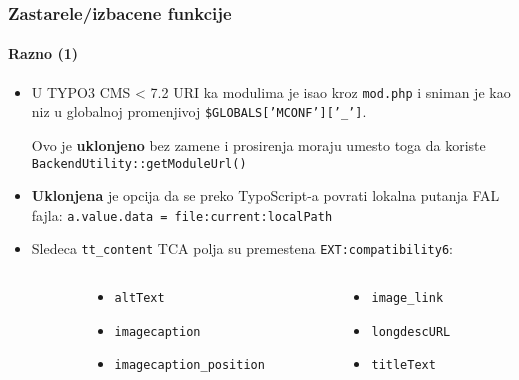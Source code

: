 \begin{frame}[fragile]
	\frametitle{Zastarele/izbacene funkcije}
	\framesubtitle{Razno (1)}

	\begin{itemize}

		\item U TYPO3 CMS < 7.2 URI ka modulima je isao kroz
			\texttt{mod.php} i sniman je kao niz u globalnoj promenjivoj
			\small\texttt{\$GLOBALS['MCONF']['\_']}\normalsize.

			Ovo je \textbf{uklonjeno} bez zamene i prosirenja moraju umesto toga da koriste
			\texttt{BackendUtility::getModuleUrl()}\normalsize\space

		\item \textbf{Uklonjena} je opcija da se preko TypoScript-a povrati lokalna putanja FAL fajla:
				\texttt{a.value.data = file:current:localPath}

		\item Sledeca \texttt{tt\_content} TCA polja su premestena
			\texttt{EXT:compatibility6}:

	\end{itemize}

	\vspace{-0.2cm}

	\begin{columns}[T]
		\begin{column}{.06\textwidth}
		\end{column}
		\begin{column}{.47\textwidth}
			\smaller
			\begin{itemize}
				\item \texttt{altText}
				\item \texttt{imagecaption}
				\item \texttt{imagecaption\_position}
			\end{itemize}
			\normalsize
		\end{column}
		\begin{column}{.47\textwidth}
			\smaller
			\begin{itemize}
				\item \texttt{image\_link}
				\item \texttt{longdescURL}
				\item \texttt{titleText}
			\end{itemize}
			\normalsize
		\end{column}
	\end{columns}

\end{frame}

